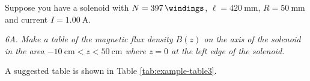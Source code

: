 \documentclass[../Elmag-labhefte-2020.tex]{subfiles}
\begin{document}
Suppose you have a solenoid with $N = \SI{397}{\windings}$, $\ell = \SI{420}{\mm}$, $R = \SI{50}{\mm}$ and current $I = \SI{1.00}{\ampere}$.

\emph{6A. Make a table of the magnetic flux density $B(z)$ on the axis of the solenoid in the area $\SI{-10}{\cm} < z < \SI{50}{\cm}$ where $z = 0$ at the left edge of the solenoid.} %


A suggested table is shown in Table \ref{tab:example-table3}.
\end{document}
